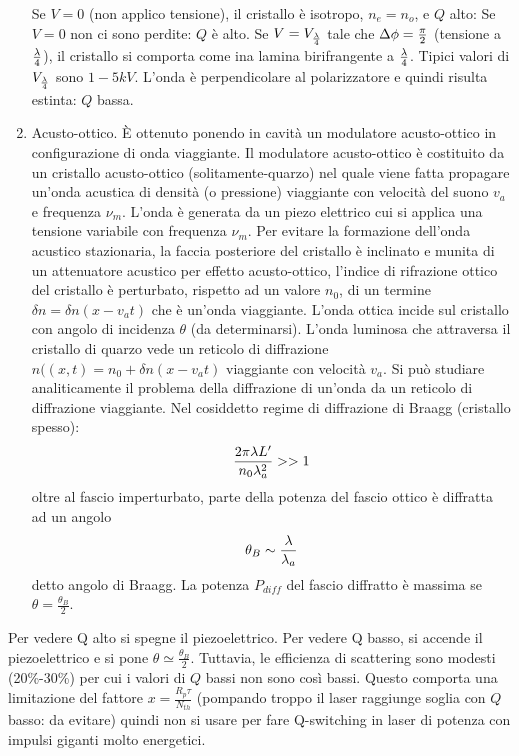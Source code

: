 \begin{enumerate}
Se $V=0$ (non applico tensione), il cristallo è isotropo, $n_e = n_o$, e $Q$ alto:
Se $V=0$ non ci sono perdite: $Q$ è alto.
Se $V=V_{\frac{\lambda}{4}}$ tale che $\Delta\phi=\frac{\pi}{2}$ (tensione a $\frac{\lambda}{4}$), il cristallo si comporta come ina lamina birifrangente a $\frac{\lambda}{4}$. Tipici valori di $V_{\frac{\lambda}{4}}$ sono $1-5 kV$.
L'onda è perpendicolare al polarizzatore e quindi risulta estinta: $Q$ bassa.
\item Acusto-ottico. È ottenuto ponendo in cavità un modulatore acusto-ottico in configurazione di onda viaggiante.
Il modulatore acusto-ottico è costituito da un cristallo acusto-ottico (solitamente-quarzo) nel quale viene fatta propagare un'onda acustica di densità (o pressione) viaggiante con velocità del suono $v_a$ e frequenza $\nu_m$. L'onda è generata da un piezo elettrico cui si applica una tensione variabile con frequenza $\nu_m$. Per evitare la formazione dell'onda acustico stazionaria, la faccia posteriore del cristallo è inclinato e munita di un attenuatore acustico per effetto acusto-ottico, l'indice di rifrazione ottico del cristallo è perturbato, rispetto ad un valore $n_0$, di un termine $\delta n = \delta n (x - v_a t)$ che è un'onda viaggiante. L'onda ottica incide sul cristallo con angolo di incidenza $\theta$ (da determinarsi).
L'onda luminosa che attraversa il cristallo di quarzo vede un reticolo di diffrazione $n((x,t) = n_0 + \delta n (x - v_a t)$ viaggiante con velocità $v_a$. Si può studiare analiticamente il problema della diffrazione di un'onda da un reticolo di diffrazione viaggiante. Nel cosiddetto regime di diffrazione di Braagg (cristallo spesso):
\begin{equation*}
\frac{2\pi \lambda L'}{n_0 \lambda_a^2} >> 1
\end{equation*}
oltre al fascio imperturbato, parte della potenza del fascio ottico è diffratta ad un angolo
\begin{equation*}
\theta_B \sim \frac{\lambda}{\lambda_a}
\end{equation*}
detto angolo di Braagg.
La potenza $P_{diff}$ del fascio diffratto è massima se $\theta = \frac{\theta_B}{2}$.
\end{enumerate}
Per vedere Q alto si spegne il piezoelettrico.
Per vedere Q basso, si accende il piezoelettrico e si pone $\theta \simeq \frac{\theta_B}{2}$.
Tuttavia, le efficienza di scattering sono modesti (20\%-30\%) per cui i valori di $Q$ bassi non sono così bassi.
Questo comporta una limitazione del fattore $x = \frac{R_p \tau}{N_{th}}$ (pompando troppo il laser raggiunge soglia con $Q$ basso: da evitare) quindi non si usare per fare Q-switching in laser di potenza con impulsi giganti molto energetici.

